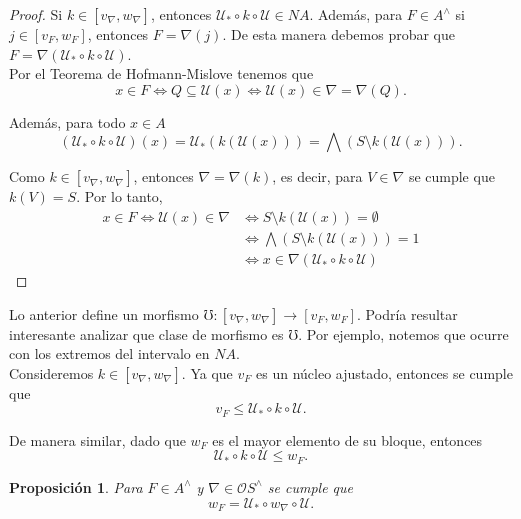 \documentclass[11pt]{amsart}
\theoremstyle{plain}
\newtheorem{prop}[thm]{Proposición}
\theoremstyle{definition}
\begin{document}
\begin{proof}
Si $k\in [v_\nabla, w_\nabla]$, entonces $\mathcal{U}_*\circ k\circ \mathcal{U}\in NA$. Además, para $F\in A^\wedge$ si $j\in [v_F, w_F]$, entonces $F=\nabla(j)$. De esta manera debemos probar que $F=\nabla(\mathcal{U}_*\circ k\circ \mathcal{U})$.\\

Por el Teorema de Hofmann-Mislove tenemos que
\[
x\in F\iff Q\subseteq \mathcal{U}(x)\iff \mathcal{U}(x)\in \nabla=\nabla(Q).
\]

Además, para todo $x\in A$
\[
(\mathcal{U}_*\circ k\circ\mathcal{U})(x)=\mathcal{U}_*(k(\mathcal{U}(x)))=\bigwedge(S\setminus k(\mathcal{U}(x))).
\]

Como $k\in [v_\nabla, w_\nabla]$, entonces $\nabla=\nabla(k)$, es decir, para $V\in \nabla$ se cumple que $k(V)=S$. Por lo tanto,
\[
\begin{split}
x\in F\iff \mathcal{U}(x)\in \nabla &\iff S\setminus k(\mathcal{U}(x))=\emptyset\\
&\iff \bigwedge(S\setminus k(\mathcal{U}(x)))=1\\
&\iff x\in \nabla(\mathcal{U}_*\circ k\circ \mathcal{U})
\end{split}
\]
\end{proof}

Lo anterior define un morfismo $\mho\colon [v_\nabla, w_\nabla]\to [v_F, w_F]$. Podría resultar interesante analizar que clase de morfismo es $\mho$. 
Por ejemplo, notemos que ocurre con los extremos del intervalo en $NA$.\\

Consideremos $k\in [v_\nabla, w_\nabla]$. Ya que $v_F$ es un núcleo ajustado, entonces se cumple que 
\begin{equation}\label{comparacionvF}
v_F\leq \mathcal{U}_*\circ k\circ \mathcal{U}. 
\end{equation}

De manera similar, dado que $w_F$ es el mayor elemento de su bloque, entonces
\begin{equation}\label{comparacionwF}
\mathcal{U}_*\circ k\circ \mathcal{U}\leq w_F.
\end{equation}

\begin{prop}\label{igualdadwF}
Para $F\in A^\wedge$ y $\nabla\in \mathcal{O}S^\wedge$ se cumple que 
\[
w_F=\mathcal{U}_*\circ w_\nabla\circ \mathcal{U}.
\]
\end{prop}
\end{document}
